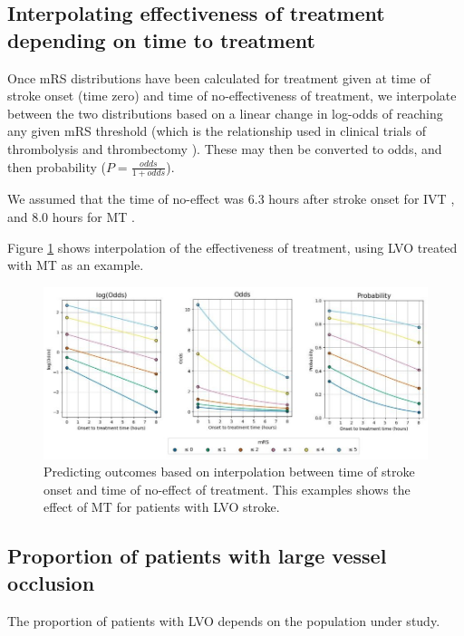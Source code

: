 \subsection{Interpolating effectiveness of treatment depending on time to treatment}

Once mRS distributions have been calculated for treatment given at time of stroke onset (time zero) and time of no-effectiveness of treatment, we interpolate between the two distributions based on a linear change in log-odds of reaching any given mRS threshold (which is the relationship used in clinical trials of thrombolysis and thrombectomy \cite{emberson_effect_2014, fransen_time_2016}). These may then be converted to odds, and then probability ($P = \frac{odds}{1 + odds}$).

We assumed that the time of no-effect was 6.3 hours after stroke onset for IVT \cite{emberson_effect_2014}, and 8.0 hours for MT \cite{fransen_time_2016}.

Figure \ref{fig:interpolation} shows interpolation of the effectiveness of treatment, using LVO treated with MT as an example.

\begin{figure}[h!]
    \centering
    \includegraphics[width=1.0\linewidth]{images_modelling/log_odds_to_probs.jpg}
    \caption{Predicting outcomes based on interpolation between time of stroke onset and time of no-effect of treatment. This examples shows the effect of MT for patients with LVO stroke.}
    \label{fig:interpolation}
\end{figure}

\subsection{Proportion of patients with large vessel occlusion}

The proportion of patients with LVO depends on the population under study.

